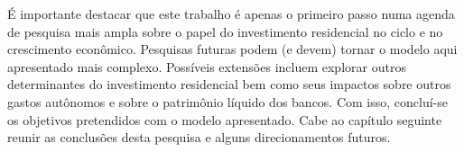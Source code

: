 É importante destacar que este trabalho é apenas o primeiro passo numa agenda de pesquisa mais ampla sobre o papel do investimento residencial no ciclo e no crescimento econômico. Pesquisas futuras podem (e devem) tornar o modelo aqui apresentado mais complexo. Possíveis extensões incluem explorar outros determinantes do investimento residencial bem como seus impactos sobre outros gastos autônomos e sobre o patrimônio líquido dos bancos.
Com isso, concluí-se os objetivos pretendidos com o modelo apresentado. Cabe ao capítulo seguinte reunir as conclusões desta pesquisa e alguns direcionamentos futuros.
